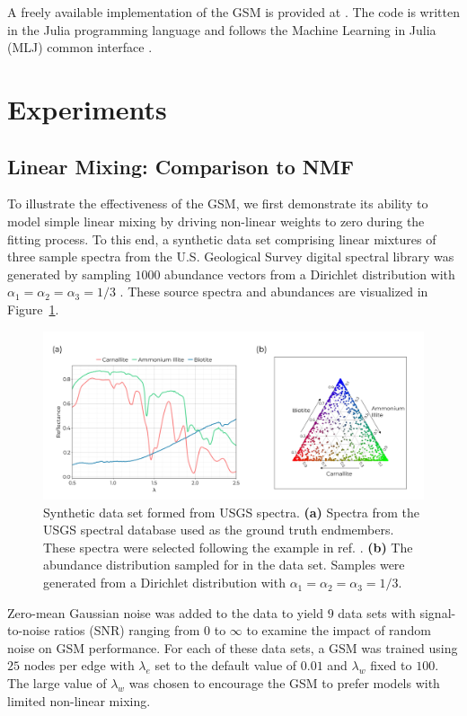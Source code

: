 \documentclass[remotesensing,article,submit,pdftex,moreauthors]{Definitions/mdpi}
\begin{document}
A freely available implementation of the GSM is provided at \cite{gtm-code}. The code is written in the Julia programming language and follows the Machine Learning in Julia (MLJ) common interface \cite{bezanson2012julia, blaom2020mlj}.

\section{Experiments}\label{sec:experiments}

\subsection{Linear Mixing: Comparison to NMF}

To illustrate the effectiveness of the GSM, we first demonstrate its ability to model simple linear mixing by driving non-linear weights to zero during the fitting process. To this end, a synthetic data set comprising linear mixtures of three sample spectra from the U.S. Geological Survey digital spectral library was generated by sampling $1000$ abundance vectors from a Dirichlet distribution with $\alpha_1=\alpha_2=\alpha_3=1/3$ \cite{usgs-spectra}. These source spectra and abundances are visualized in Figure~\ref{fig:usgs-data}.

\begin{figure}[H]
\includegraphics[width=\columnwidth]{paper/figures/methods/usgs/usgs-dataset.pdf}
\caption{Synthetic data set formed from USGS spectra. \textbf{(a)} Spectra from the USGS spectral database used as the ground truth endmembers. These spectra were selected following the example in ref. \cite{vca-orig}. \textbf{(b)} The abundance distribution sampled for in the data set. Samples were generated from a Dirichlet distribution with $\alpha_1=\alpha_2=\alpha_3=1/3$.}
\label{fig:usgs-data}
\end{figure}  

Zero-mean Gaussian noise was added to the data to yield $9$ data sets with signal-to-noise ratios (SNR) ranging from $0$ to $\infty$ to examine the impact of random noise on GSM performance. For each of these data sets, a GSM was trained using $25$ nodes per edge with $\lambda_e$ set to the default value of $0.01$ and $\lambda_w$ fixed to $100$. The large value of $\lambda_w$ was chosen to encourage the GSM to prefer models with limited non-linear mixing.
\end{document}
